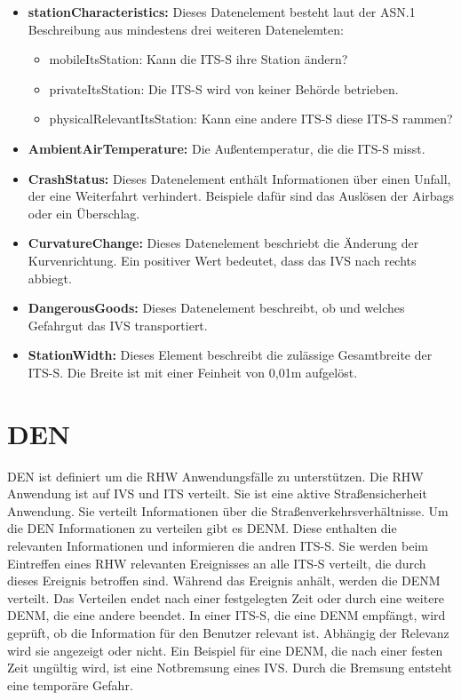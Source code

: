 \begin{itemize}
	\item \textbf{stationCharacteristics: } Dieses Datenelement besteht laut der \ac{ASN.1} Beschreibung aus mindestens drei weiteren Datenelemten:
	\begin{itemize}
		\item mobileItsStation: Kann die \ac{ITS-S} ihre Station ändern?
		\item privateItsStation: Die \ac{ITS-S} wird von keiner Behörde betrieben.
		\item physicalRelevantItsStation: Kann eine andere \ac{ITS-S} diese \ac{ITS-S} rammen?
	\end{itemize}
	\item \textbf{AmbientAirTemperature: } Die Außentemperatur, die die \ac{ITS-S} misst.
	\item \textbf{CrashStatus: } Dieses Datenelement enthält Informationen über einen Unfall, der eine Weiterfahrt verhindert. Beispiele dafür sind das Auslösen der Airbags oder ein Überschlag.
	\item \textbf{CurvatureChange: } Dieses Datenelement beschriebt die Änderung der Kurvenrichtung. Ein positiver Wert bedeutet, dass das \ac{IVS} nach rechts abbiegt.
	\item  \textbf{DangerousGoods: } Dieses Datenelement beschreibt, ob und welches Gefahrgut  das \ac{IVS} transportiert.
	\item \textbf{StationWidth: } Dieses Element beschreibt die zulässige Gesamtbreite der \ac{ITS-S}. Die Breite ist mit einer Feinheit von 0,01m aufgelöst.
\end{itemize}


\section{DEN\label{sec:den}}
\ac{DEN} ist definiert um die \ac{RHW} Anwendungsfälle zu unterstützen.	Die \ac{RHW} Anwendung ist auf \ac{IVS} und \ac{ITS} verteilt. Sie ist eine aktive Straßensicherheit Anwendung. Sie verteilt Informationen über die Straßenverkehrsverhältnisse. Um die \ac{DEN} Informationen zu verteilen gibt es \ac{DENM}. Diese enthalten die relevanten Informationen und informieren die andren \ac{ITS-S}. Sie werden beim Eintreffen eines \ac{RHW} relevanten Ereignisses an alle \ac{ITS-S} verteilt, die durch dieses Ereignis betroffen sind. Während das Ereignis anhält, werden die \ac{DENM} verteilt. Das Verteilen endet nach einer festgelegten Zeit oder durch eine weitere \ac{DENM}, die eine andere beendet. In einer \ac{ITS-S}, die eine \ac{DENM} empfängt, wird geprüft, ob die Information für den Benutzer relevant ist. Abhängig der Relevanz wird sie angezeigt oder nicht. Ein Beispiel für eine \ac{DENM}, die nach einer festen Zeit ungültig wird, ist eine Notbremsung eines \ac{IVS}. Durch die Bremsung entsteht eine temporäre Gefahr. 

